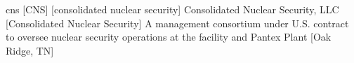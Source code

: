 \newglsXcompany%
{cns}%
[CNS]%
[consolidated nuclear security]%
{Consolidated Nuclear Security, LLC}%
[Consolidated Nuclear Security]%
{A management consortium under U.S. contract to oversee nuclear security operations at the  facility and Pantex Plant \cite{website:Consolidated_Nuclear_Security}}%
[Oak Ridge, TN]%